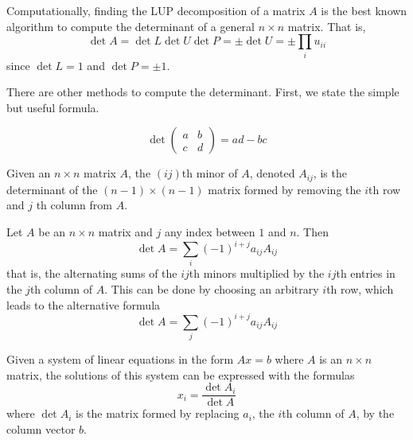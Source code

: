   Computationally, finding the LUP decomposition of a matrix $A$ is the best known algorithm to compute the determinant of a general $n \times n$ matrix. That is, 
  \begin{equation}
    \det{A} = \det{L} \det{U} \det{P} = \pm \det{U} = \pm \prod_i u_{i i}
  \end{equation}
  since $\det{L} = 1$ and $\det{P} = \pm 1$. 

  There are other methods to compute the determinant. First, we state the simple but useful formula.

  \begin{proposition}
    \begin{equation}
      \det{\begin{pmatrix}
      a&b\\c&d 
      \end{pmatrix}} = a d - b c
    \end{equation}
  \end{proposition}

  \begin{definition}
    Given an $n \times n$ matrix $A$, the $(i j)$th minor of $A$, denoted $A_{i j}$, is the determinant of the $(n-1) \times (n-1)$ matrix formed by removing the $i$th row and $j$ th column from $A$. 
  \end{definition}

  \begin{theorem}
    Let $A$ be an $n \times n$ matrix and $j$ any index between $1$ and $n$. Then
    \begin{equation}
      \det{A} = \sum_i (-1)^{i + j} a_{i j} A_{i j}
    \end{equation}
    that is, the alternating sums of the $ij$th minors multiplied by the $ij$th entries in the $j$th column of $A$. This can be done by choosing an arbitrary $i$th row, which leads to the alternative formula 
    \begin{equation}
      \det{A} = \sum_j (-1)^{i + j} a_{i j} A_{i j} 
    \end{equation}
  \end{theorem}

  \begin{theorem}
    Given a system of linear equations in the form $A x = b$ where $A$ is an $n \times n$ matrix, the solutions of this system can be expressed with the formulas 
    \begin{equation}
      x_i = \frac{ \det{A_i}}{\det{A}}
    \end{equation}
    where $\det{A_i}$ is the matrix formed by replacing $a_i$, the $i$th column of $A$, by the column vector $b$. 
  \end{theorem}

